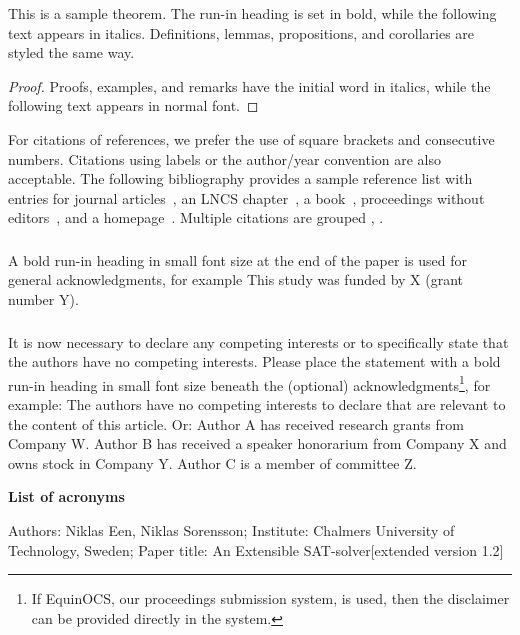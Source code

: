 \documentclass[runningheads]{llncs}
\begin{document}
\begin{theorem}
This is a sample theorem. The run-in heading is set in bold, while
the following text appears in italics. Definitions, lemmas,
propositions, and corollaries are styled the same way.
\end{theorem}
%
%
\begin{proof}
Proofs, examples, and remarks have the initial word in italics,
while the following text appears in normal font.
\end{proof}
For citations of references, we prefer the use of square brackets
and consecutive numbers. Citations using labels or the author/year
convention are also acceptable. The following bibliography provides
a sample reference list with entries for journal
articles~\cite{ref_article1}, an LNCS chapter~\cite{ref_lncs1}, a
book~\cite{ref_book1}, proceedings without editors~\cite{ref_proc1},
and a homepage~\cite{ref_url1}. Multiple citations are grouped
\cite{ref_article1,ref_lncs1,ref_book1},
\cite{ref_article1,ref_book1,ref_proc1,ref_url1}.

\begin{credits}
\subsubsection{\ackname} A bold run-in heading in small font size at the end of the paper is
used for general acknowledgments, for example This study was funded
by X (grant number Y).

\subsubsection{\discintname}
It is now necessary to declare any competing interests or to specifically
state that the authors have no competing interests. Please place the
statement with a bold run-in heading in small font size beneath the
(optional) acknowledgments\footnote{If EquinOCS, our proceedings submission
system, is used, then the disclaimer can be provided directly in the system.},
for example: The authors have no competing interests to declare that are
relevant to the content of this article. Or: Author A has received research
grants from Company W. Author B has received a speaker honorarium from
Company X and owns stock in Company Y. Author C is a member of committee Z.
\end{credits}
%
%
%
% 
% 
%
\newpage
{\noindent \huge \textbf{List of acronyms}\par}

\begin{acronym}
\end{acronym}
\begin{thebibliography}{8}
Authors: Niklas Een, Niklas Sorensson; Institute: Chalmers University of Technology, Sweden; Paper title: An Extensible SAT-solver[extended version 1.2]

\end{thebibliography}
\end{document}
